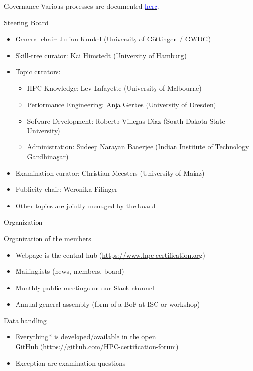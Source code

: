 \documentclass[compress,aspectratio=169]{beamer}
\newcommand{\hrefb}[2]{\href{#1}{\textcolor{blue}{#2}}}
\begin{document}
\begin{frame}{Governance}
	\smallskip
  Various processes are documented \hrefb{https://www.hpc-certification.org/processes/}{here}.
  \begin{block}{Steering Board}
  \vspace*{-0.5em}
  \begin{itemize}
    \item General chair: Julian Kunkel (University of Göttingen / GWDG)
    \item Skill-tree curator: Kai Himstedt (University of Hamburg)
    \item Topic curators:
    \begin{itemize}
      \item HPC Knowledge: Lev Lafayette (University of Melbourne)
      \item Performance Engineering: Anja Gerbes (University of Dresden)
      \item Sofware Development: Roberto Villegas-Diaz (South Dakota State University)
      \item Administration: Sudeep Narayan Banerjee (Indian Institute of Technology Gandhinagar)
    \end{itemize}    
    \item Examination curator: Christian Meesters (University of Mainz)
    \item Publicity chair: Weronika Filinger
    \item Other topics are jointly managed by the board
  \end{itemize}
  \end{block}
\end{frame}



\begin{frame}{Organization}
  \begin{block}{Organization of the members}
	\begin{itemize}
  \item Webpage is the central hub (\url{https://www.hpc-certification.org})
  \item Mailinglists (news, members, board)
	\item Monthly public meetings on our Slack channel
  \item Annual general assembly (form of a BoF at ISC or workshop)
  \end{itemize}
  \end{block}

  \begin{block}{Data handling}
    \begin{itemize}
      \item Everything* is developed/available in the open \\
        GitHub (\url{https://github.com/HPC-certification-forum})
      \item Exception are examination questions
    \end{itemize}
  \end{block}
\end{frame}
\end{document}
